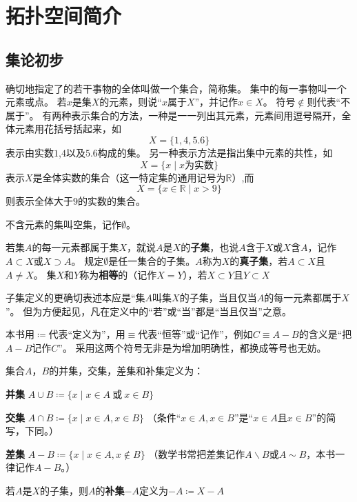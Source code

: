 \chapter{拓扑空间简介}

\section{集论初步}

确切地指定了的若干事物的全体叫做一个集合，简称集。
集中的每一事物叫一个元素或点。
若$x$是集$X$的元素，则说``$x$属于$X$''，并记作$x \in X$。
符号$\notin$则代表``不属于''。
有两种表示集合的方法，一种是一一列出其元素，元素间用逗号隔开，全体元素用花括号括起来，如
$$X = \{1, 4, 5.6\}$$
表示由实数$1$,$4$以及$5.6$构成的集。
另一种表示方法是指出集中元素的共性，如
$$X = \{x \mid \text{$x$为实数}\}$$
表示$X$是全体实数的集合（这一特定集的通用记号为$\mathbb{R}$）,而
$$X = \{x \in \mathbb{R} \mid x > 9\}$$
则表示全体大于$9$的实数的集合。

不含元素的集叫空集，记作$\emptyset$。

\begin{definition}
	若集$A$的每一元素都属于集$X$，就说$A$是$X$的\textbf{子集}，也说$A$含于$X$或$X$含$A$，记作$A \subset X$或$X \supset A$。
	规定$\emptyset$是任一集合的子集。$A$称为$X$的\textbf{真子集}，若$A \subset X$且$A \neq X$。
	集$X$和$Y$称为\textbf{相等}的（记作$X = Y$），若$X \subset Y$且$Y \subset X$
\end{definition}

\begin{note}
	子集定义的更确切表述本应是``集$A$叫集$X$的子集，当且仅当$A$的每一元素都属于$X$''。
	但为方便起见，凡在定义中的``若''或``当''都是``当且仅当''之意。
\end{note}

本书用$\coloneq$代表``定义为''，用$\equiv$代表``恒等''或``记作''，例如$C \equiv A - B$的含义是``把$A - B$记作$C$''。
采用这两个符号无非是为增加明确性，都换成等号也无妨。

\begin{definition}
	集合$A$，$B$的并集，交集，差集和补集定义为：

	\textbf{并集} $A \cup B \coloneq \{x \mid x \in A ~ \text{或} ~ x \in B\}$

	\textbf{交集} $A \cap B \coloneq \{x \mid x \in A, x \in B\}$ （条件``$x \in A, x \in B$''是``$x \in A \text{且} x \in B$''的简写，下同。）

	\textbf{差集} $A - B \coloneq \{x \mid x \in A, x \notin B\}$ （数学书常把差集记作$A \backslash B \text{或} A \sim B$，本书一律记作$A - B$。）

	若$A$是$X$的子集，则$A$的\textbf{补集}$-A$定义为$-A \coloneq X - A$

\end{definition}


